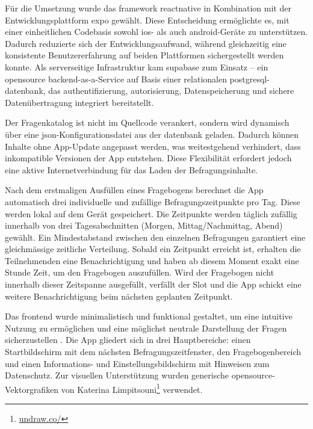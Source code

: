 Für die Umsetzung wurde das \gls{framework} \gls{reactnative} in Kombination mit der Entwicklungsplattform \gls{expo} gewählt. Diese Entscheidung ermöglichte es, mit einer einheitlichen Codebasis sowohl \gls{ios}- als auch \gls{android}-Geräte zu unterstützen. Dadurch reduzierte sich der Entwicklungsaufwand, während gleichzeitig eine konsistente Benutzererfahrung auf beiden Plattformen sichergestellt werden konnte. Als serverseitige Infrastruktur kam \gls{supabase} zum Einsatz – ein \gls{opensource} \gls{backend}-as-a-Service auf Basis einer relationalen \gls{postgresql}-\gls{datenbank}, das \gls{authentifizierung}, \gls{autorisierung}, Datenspeicherung und sichere Datenübertragung integriert bereitstellt.

Der Fragenkatalog ist nicht im Quellcode verankert, sondern wird dynamisch über eine \gls{json}-Konfigurationsdatei aus der \gls{datenbank} geladen. Dadurch können Inhalte ohne App-Update angepasst werden, was weitestgehend verhindert, dass inkompatible Versionen der App entstehen. Diese Flexibilität erfordert jedoch eine aktive Internetverbindung für das Laden der Befragungsinhalte.

Nach dem erstmaligen Ausfüllen eines Fragebogens berechnet die App automatisch drei individuelle und zufällige Befragungszeitpunkte pro Tag. Diese werden lokal auf dem Gerät gespeichert. Die Zeitpunkte werden täglich zufällig innerhalb von drei Tagesabschnitten (Morgen, Mittag/Nachmittag, Abend) gewählt. Ein Mindestabstand zwischen den einzelnen Befragungen garantiert eine gleichmässige zeitliche Verteilung. Sobald ein Zeitpunkt erreicht ist, erhalten die Teilnehmenden eine Benachrichtigung und haben ab diesem Moment exakt eine Stunde Zeit, um den Fragebogen auszufüllen. Wird der Fragebogen nicht innerhalb dieser Zeitspanne ausgefüllt, verfällt der Slot und die App schickt eine weitere Benachrichtigung beim nächsten geplanten Zeitpunkt.

Das \gls{frontend} wurde minimalistisch und funktional gestaltet, um eine intuitive Nutzung zu ermöglichen und eine möglichst neutrale Darstellung der Fragen sicherzustellen \parencite{rogersInteractionDesignHumancomputer2023}. Die App gliedert sich in drei Hauptbereiche: einen Startbildschirm mit dem nächsten Befragungszeitfenster, den Fragebogenbereich und einen Informations- und Einstellungsbildschirm mit Hinweisen zum Datenschutz. Zur visuellen Unterstützung wurden generische \gls{opensource}-Vektorgrafiken von Katerina Limpitsouni\footnote{\href{https://undraw.co/}{undraw.co/}} verwendet.


